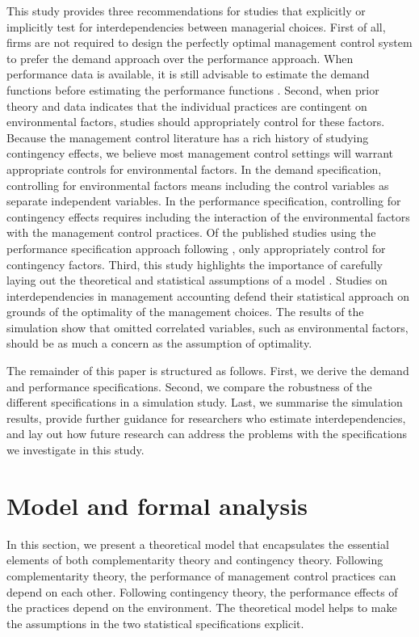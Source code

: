 \documentclass[12pt]{article}
\begin{document}
This study provides three recommendations for studies that explicitly or implicitly test for interdependencies between managerial choices. First of all, firms are not required to design the perfectly optimal management control system to prefer the demand approach over the performance approach. When performance data is available, it is still advisable to estimate the demand functions before estimating the performance functions \citep{Aral2012, Cassiman2006}. Second, when prior theory and data indicates that the individual practices are contingent on environmental factors, studies should appropriately control for these factors. Because the management control literature has a rich history of studying contingency effects, we believe most management control settings will warrant appropriate controls for environmental factors. In the demand specification, controlling for environmental factors means including the control variables as separate independent variables. In the performance specification, controlling for contingency effects requires including the interaction of the environmental factors with the management control practices. Of the published studies using the performance specification approach following \citet{Grabner2013}, only \citet{Bedford2016,Bedford2018PerformanceFirms} appropriately control for contingency factors. Third, this study highlights the importance of carefully laying out the theoretical and statistical assumptions of a model \citep{Chenhall2007}. Studies on interdependencies in management accounting defend their statistical approach on grounds of the optimality of the management choices. The results of the simulation show that omitted correlated variables, such as environmental factors, should be as much a concern as the assumption of optimality.

The remainder of this paper is structured as follows. First, we derive the demand and performance specifications. Second, we compare the robustness of the different specifications in a simulation study. Last, we summarise the simulation results, provide further guidance for researchers who estimate interdependencies, and lay out how future research can address the problems with the specifications we investigate in this study.

\section{Model and formal analysis}\label{model-and-formal-analysis}

In this section, we present a theoretical model that encapsulates the essential elements of both complementarity theory and contingency theory. Following complementarity theory, the performance of management control practices can depend on each other. Following contingency theory, the performance effects of the practices depend on the environment. The theoretical model helps to make the assumptions in the two statistical specifications explicit. 
\end{document}
